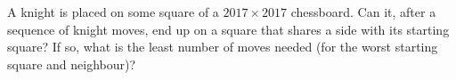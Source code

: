 A knight is placed on some square of a $2017\times2017$ chessboard. Can it, after a sequence of knight moves, end up on a square that shares a side with its starting square? If so, what is the least number of moves needed (for the worst starting square and neighbour)?
